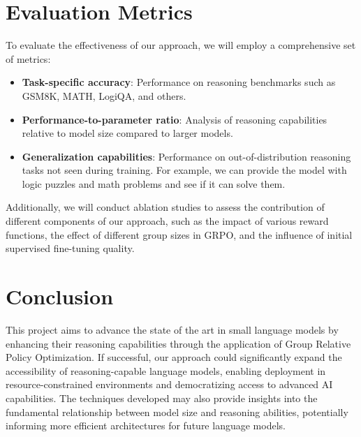 \documentclass[11pt, oneside]{article}   	%
\begin{document}
\section*{Evaluation Metrics}

To evaluate the effectiveness of our approach, we will employ a comprehensive set of metrics:

\begin{itemize}
	\item \textbf{Task-specific accuracy}: Performance on reasoning benchmarks such as GSM8K, MATH, LogiQA, and others.

	\item \textbf{Performance-to-parameter ratio}: Analysis of reasoning capabilities relative to model size compared to larger models.

	\item \textbf{Generalization capabilities}: Performance on out-of-distribution reasoning tasks not seen during training. For example, we can provide the model with logic puzzles and math problems and see if it can solve them.
\end{itemize}

Additionally, we will conduct ablation studies to assess the contribution of different components of our approach, such as the impact of various reward functions, the effect of different group sizes in GRPO, and the influence of initial supervised fine-tuning quality.

\section*{Conclusion}

This project aims to advance the state of the art in small language models by enhancing their reasoning capabilities through the application of Group Relative Policy Optimization. If successful, our approach could significantly expand the accessibility of reasoning-capable language models, enabling deployment in resource-constrained environments and democratizing access to advanced AI capabilities. The techniques developed may also provide insights into the fundamental relationship between model size and reasoning abilities, potentially informing more efficient architectures for future language models.

\printbibliography
\end{document}
